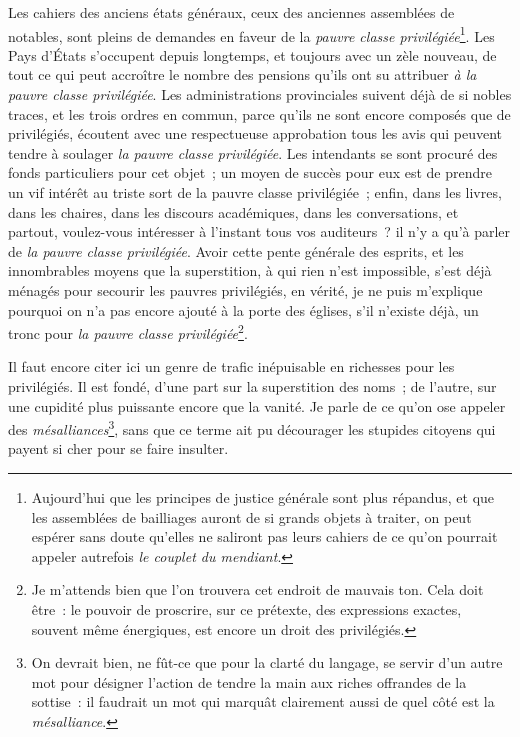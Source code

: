 \documentclass[french,twoside]{book} %
\begin{document}
Les cahiers des anciens états généraux, ceux des anciennes assemblées de notables, sont pleins de demandes en faveur de la {\itshape pauvre classe privilégiée}\footnote{Aujourd’hui que les principes de justice générale sont plus répandus, et que les assemblées de bailliages auront de si grands objets à traiter, on peut espérer sans doute qu’elles ne saliront pas leurs cahiers de ce qu’on pourrait appeler autrefois {\itshape le couplet du mendiant}.}. Les Pays d’États s’occupent depuis longtemps, et toujours avec un zèle nouveau, de tout ce qui peut accroître le nombre des pensions qu’ils ont su attribuer {\itshape à la pauvre classe privilégiée}. Les administrations provinciales suivent déjà de si nobles traces, et les trois ordres en commun, parce qu’ils ne sont encore composés que de privilégiés, écoutent avec une respectueuse approbation tous les avis qui peuvent tendre à soulager {\itshape la pauvre classe privilégiée}. Les intendants se sont procuré des fonds particuliers pour cet objet ; un moyen de succès pour eux est de prendre un vif intérêt au triste sort de la pauvre classe privilégiée ; enfin, dans les livres, dans les chaires, dans les discours académiques, dans les conversations, et partout, voulez-vous intéresser à l’instant tous vos auditeurs ? il n’y a qu’à parler de {\itshape la pauvre classe privilégiée}. Avoir cette pente générale des esprits, et les innombrables moyens que la superstition, à qui rien n’est impossible, s’est déjà ménagés pour secourir les pauvres privilégiés, en vérité, je ne puis m’explique pourquoi on n’a pas encore ajouté à la porte des églises, s’il n’existe déjà, un tronc pour {\itshape la pauvre classe privilégiée}\footnote{Je m’attends bien que l’on trouvera cet endroit de mauvais ton. Cela doit être : le pouvoir de proscrire, sur ce prétexte, des expressions exactes, souvent même énergiques, est encore un droit des privilégiés.}.\par
Il faut encore citer ici un genre de trafic inépuisable en richesses pour les privilégiés. Il est fondé, d’une part sur la superstition des noms ; de l’autre, sur une cupidité plus puissante encore que la vanité. Je parle de ce qu’on ose appeler des {\itshape mésalliances}\footnote{On devrait bien, ne fût-ce que pour la clarté du langage, se servir d’un autre mot pour désigner l’action de tendre la main aux riches offrandes de la sottise : il faudrait un mot qui marquât clairement aussi de quel côté est la {\itshape mésalliance}.}, sans que ce terme ait pu décourager les stupides citoyens qui payent si cher pour se faire insulter.\par
\end{document}
